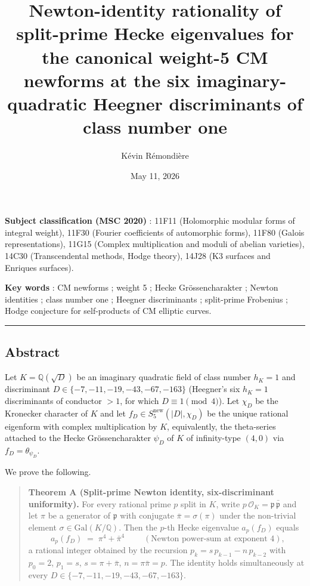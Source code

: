 \documentclass[
  11pt,
  a4paper,
]{amsart}
\title[Newton-identity rationality for $h_K=1$ CM newforms]{Newton-identity rationality of split-prime Hecke eigenvalues for the canonical weight-5 CM newforms at the six imaginary-quadratic Heegner discriminants of class number one}
\author{K\'evin R\'emondi\`ere}
\date{May 11, 2026}
\begin{document}
\maketitle

\textbf{Subject classification (MSC 2020)} : 11F11 (Holomorphic modular forms of integral weight), 11F30 (Fourier coefficients of automorphic forms), 11F80 (Galois representations), 11G15 (Complex multiplication and moduli of abelian varieties), 14C30 (Transcendental methods, Hodge theory), 14J28 (K3 surfaces and Enriques surfaces).

\textbf{Key words} : CM newforms ; weight 5 ; Hecke Grössencharakter ; Newton identities ; class number one ; Heegner discriminants ; split-prime Frobenius ; Hodge conjecture for self-products of CM elliptic curves.

\begin{center}\rule{0.5\linewidth}{0.5pt}\end{center}

\hypertarget{abstract}{%
\subsection{Abstract}\label{abstract}}

Let \(K = \mathbb{Q}(\sqrt{D})\) be an imaginary quadratic field of class number \(h_K = 1\) and discriminant \(D \in \{-7, -11, -19, -43, -67, -163\}\) (Heegner's six \(h_K = 1\) discriminants of conductor \(> 1\), for which \(D \equiv 1 \pmod 4\)). Let \(\chi_D\) be the Kronecker character of \(K\) and let \(f_D \in S_5^{\mathrm{new}}(|D|, \chi_D)\) be the unique rational eigenform with complex multiplication by \(K\), equivalently, the theta-series attached to the Hecke Grössencharakter \(\psi_D\) of \(K\) of infinity-type \((4, 0)\) via \(f_D = \theta_{\psi_D}\).

We prove the following.

\begin{quote}
\textbf{Theorem A (Split-prime Newton identity, six-discriminant uniformity).} For every rational prime \(p\) split in \(K\), write \(p\,\mathcal{O}_K = \mathfrak{p}\,\bar{\mathfrak{p}}\) and let \(\pi\) be a generator of \(\mathfrak{p}\) with conjugate \(\bar\pi = \sigma(\pi)\) under the non-trivial element \(\sigma \in \mathrm{Gal}(K/\mathbb{Q})\). Then the \(p\)-th Hecke eigenvalue \(a_p(f_D)\) equals
\[
\boxed{\;a_p(f_D) \;=\; \pi^{4} + \bar\pi^{4}\;} \qquad (\text{Newton power-sum at exponent } 4),
\]
a rational integer obtained by the recursion \(p_k = s\,p_{k-1} - n\,p_{k-2}\) with \(p_0 = 2\), \(p_1 = s\), \(s = \pi + \bar\pi\), \(n = \pi\bar\pi = p\). The identity holds simultaneously at every \(D \in \{-7, -11, -19, -43, -67, -163\}\).
\end{quote}
\end{document}
